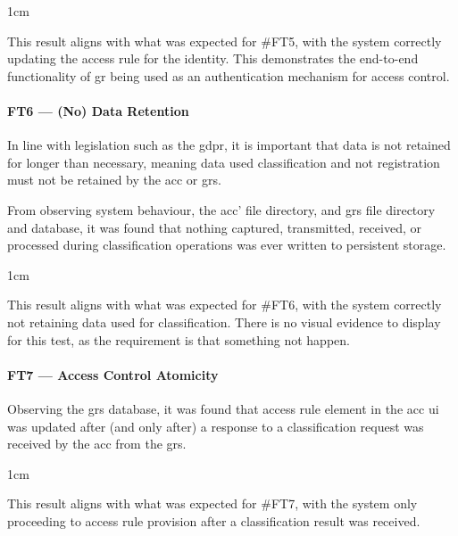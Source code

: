 \begin{adjustwidth}{1cm}{}
	\begin{tcolorbox}[colback=green!5, boxrule=0pt, frame empty]
		This result aligns with what was expected for \#FT5, with the system correctly updating the access rule for the identity.
		This demonstrates the end-to-end functionality of \ac{gr} being used as an authentication mechanism for access control.
	\end{tcolorbox}
\end{adjustwidth}

\paragraph{FT6 --- (No) Data Retention}
In line with legislation such as the \ac{gdpr}, it is important that data is not retained for longer than necessary, meaning data used classification and not registration must not be retained by the \ac{acc} or \ac{grs}.

From observing system behaviour, the \ac{acc}' file directory, and \ac{grs} file directory and database, it was found that nothing captured, transmitted, received, or processed during classification operations was ever written to persistent storage.

\begin{adjustwidth}{1cm}{}
	\begin{tcolorbox}[colback=green!5, boxrule=0pt, frame empty]
		This result aligns with what was expected for \#FT6, with the system correctly not retaining data used for classification.
		There is no visual evidence to display for this test, as the requirement is that something not happen.
	\end{tcolorbox}
\end{adjustwidth}

\paragraph{FT7 --- Access Control Atomicity}

Observing the \ac{grs} database, it was found that access rule element in the \ac{acc} \ac{ui} was updated after (and only after) a response to a classification request was received by the \ac{acc} from the \ac{grs}.

\begin{adjustwidth}{1cm}{}
	\begin{tcolorbox}[colback=green!5, boxrule=0pt, frame empty]
		This result aligns with what was expected for \#FT7, with the system only proceeding to access rule provision after a classification result was received.
	\end{tcolorbox}
\end{adjustwidth}

